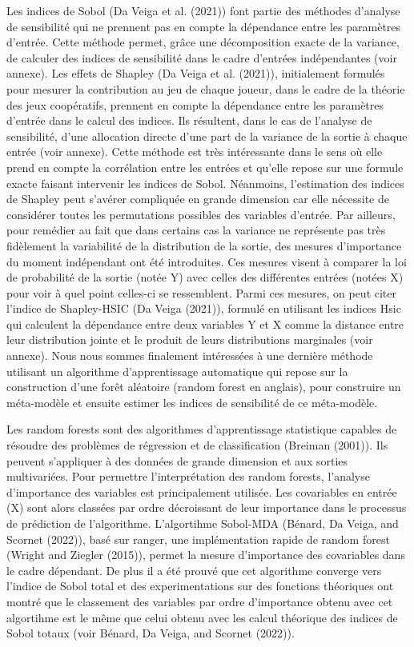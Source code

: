 \documentclass[
]{article}
\begin{document}
Les indices de Sobol (Da Veiga et al. (2021)) font partie des méthodes
d'analyse de sensibilité qui ne prennent pas en compte la dépendance
entre les paramètres d'entrée. Cette méthode permet, grâce une
décomposition exacte de la variance, de calculer des indices de
sensibilité dans le cadre d'entrées indépendantes (voir annexe). Les
effets de Shapley (Da Veiga et al. (2021)), initialement formulés pour
mesurer la contribution au jeu de chaque joueur, dans le cadre de la
théorie des jeux coopératifs, prennent en compte la dépendance entre les
paramètres d'entrée dans le calcul des indices. Ils résultent, dans le
cas de l'analyse de sensibilité, d'une allocation directe d'une part de
la variance de la sortie à chaque entrée (voir annexe). Cette méthode
est très intéressante dans le sens où elle prend en compte la
corrélation entre les entrées et qu'elle repose sur une formule exacte
faisant intervenir les indices de Sobol. Néanmoins, l'estimation des
indices de Shapley peut s'avérer compliquée en grande dimension car elle
nécessite de considérer toutes les permutations possibles des variables
d'entrée. Par ailleurs, pour remédier au fait que dans certains cas la
variance ne représente pas très fidèlement la variabilité de la
distribution de la sortie, des mesures d'importance du moment
indépendant ont été introduites. Ces mesures visent à comparer la loi de
probabilité de la sortie (notée Y) avec celles des différentes entrées
(notées X) pour voir à quel point celles-ci se ressemblent. Parmi ces
mesures, on peut citer l'indice de Shapley-HSIC (Da Veiga (2021)),
formulé en utilisant les indices Hsic qui calculent la dépendance entre
deux variables Y et X comme la distance entre leur distribution jointe
et le produit de leurs distributions marginales (voir annexe). Nous nous
sommes finalement intéressées à une dernière méthode utilisant un
algorithme d'apprentissage automatique qui repose sur la construction
d'une forêt aléatoire (random forest en anglais), pour construire un
méta-modèle et ensuite estimer les indices de sensibilité de ce
méta-modèle.

Les random forests sont des algorithmes d'apprentissage statistique
capables de résoudre des problèmes de régression et de classification
(Breiman (2001)). Ils peuvent s'appliquer à des données de grande
dimension et aux sorties multivariées. Pour permettre l'interprétation
des random forests, l'analyse d'importance des variables est
principalement utilisée. Les covariables en entrée (X) sont alors
classées par ordre décroissant de leur importance dans le processus de
prédiction de l'algorithme. L'algortihme Sobol-MDA (Bénard, Da Veiga,
and Scornet (2022)), basé sur ranger, une implémentation rapide de
random forest (Wright and Ziegler (2015)), permet la mesure d'importance
des covariables dans le cadre dépendant. De plus il a été prouvé que cet
algorithme converge vers l'indice de Sobol total et des experimentations
sur des fonctions théoriques ont montré que le classement des variables
par ordre d'importance obtenu avec cet algortihme est le même que celui
obtenu avec les calcul théorique des indices de Sobol totaux (voir
Bénard, Da Veiga, and Scornet (2022)).
\end{document}
